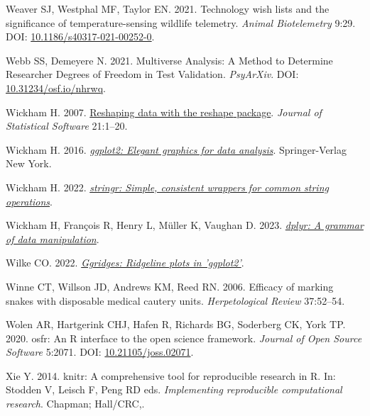 \documentclass[10pt,a4paper]{article}
\newlength{\cslhangindent}
\newlength{\cslentryspacingunit} %
\newenvironment{CSLReferences}[2] %
 {%
  \setlength{\parindent}{0pt}
  \ifodd #1
  \let\oldpar\par
  \def\par{\hangindent=\cslhangindent\oldpar}
  \fi
  \setlength{\parskip}{#2\cslentryspacingunit}
 }%
 {}
\begin{document}
\begin{CSLReferences}{1}{0}
\leavevmode{}%
Weaver SJ, Westphal MF, Taylor EN. 2021. Technology wish lists and the significance of temperature-sensing wildlife telemetry. \emph{Animal Biotelemetry} 9:29. DOI: \href{https://doi.org/10.1186/s40317-021-00252-0}{10.1186/s40317-021-00252-0}.

\leavevmode{}%
Webb SS, Demeyere N. 2021. Multiverse {Analysis}: {A} {Method} to {Determine} {Researcher} {Degrees} of {Freedom} in {Test} {Validation}. \emph{PsyArXiv}. DOI: \href{https://doi.org/10.31234/osf.io/nhrwq}{10.31234/osf.io/nhrwq}.

\leavevmode{}%
Wickham H. 2007. \href{http://www.jstatsoft.org/v21/i12/}{Reshaping data with the {reshape} package}. \emph{Journal of Statistical Software} 21:1--20.

\leavevmode{}%
Wickham H. 2016. \emph{\href{https://ggplot2.tidyverse.org}{ggplot2: Elegant graphics for data analysis}}. Springer-Verlag New York.

\leavevmode{}%
Wickham H. 2022. \emph{\href{https://CRAN.R-project.org/package=stringr}{{stringr}: Simple, consistent wrappers for common string operations}}.

\leavevmode{}%
Wickham H, François R, Henry L, Müller K, Vaughan D. 2023. \emph{\href{https://CRAN.R-project.org/package=dplyr}{{dplyr}: A grammar of data manipulation}}.

\leavevmode{}%
Wilke CO. 2022. \emph{\href{https://CRAN.R-project.org/package=ggridges}{Ggridges: Ridgeline plots in 'ggplot2'}}.

\leavevmode{}%
Winne CT, Willson JD, Andrews KM, Reed RN. 2006. Efficacy of marking snakes with disposable medical cautery units. \emph{Herpetological Review} 37:52--54.

\leavevmode{}%
Wolen AR, Hartgerink CHJ, Hafen R, Richards BG, Soderberg CK, York TP. 2020. {osfr}: An {R} interface to the open science framework. \emph{Journal of Open Source Software} 5:2071. DOI: \href{https://doi.org/10.21105/joss.02071}{10.21105/joss.02071}.

\leavevmode{}%
Xie Y. 2014. {knitr}: A comprehensive tool for reproducible research in {R}. In: Stodden V, Leisch F, Peng RD eds. \emph{Implementing reproducible computational research}. Chapman; Hall/CRC,.


\end{CSLReferences}
\end{document}
